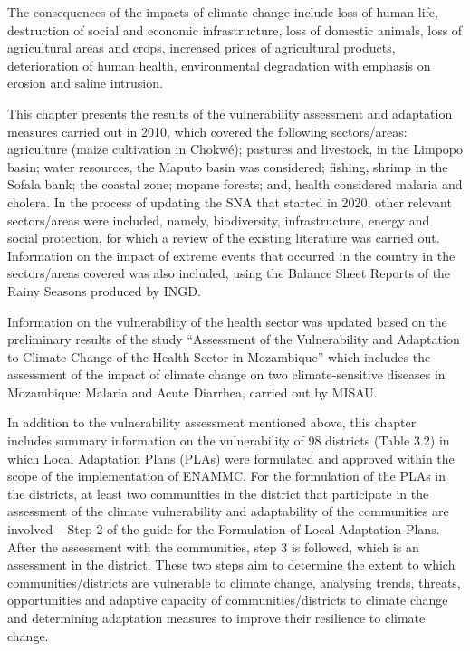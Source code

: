\documentclass[
]{book}
\begin{document}
The consequences of the impacts of climate change include loss of human life, destruction of social and economic infrastructure, loss of domestic animals, loss of agricultural areas and crops, increased prices of agricultural products, deterioration of human health, environmental degradation with emphasis on erosion and saline intrusion.

This chapter presents the results of the vulnerability assessment and adaptation measures carried out in 2010, which covered the following sectors/areas: agriculture (maize cultivation in Chokwé); pastures and livestock, in the Limpopo basin; water resources, the Maputo basin was considered; fishing, shrimp in the Sofala bank; the coastal zone; mopane forests; and, health considered malaria and cholera. In the process of updating the SNA that started in 2020, other relevant sectors/areas were included, namely, biodiversity, infrastructure, energy and social protection, for which a review of the existing literature was carried out. Information on the impact of extreme events that occurred in the country in the sectors/areas covered was also included, using the Balance Sheet Reports of the Rainy Seasons produced by INGD.

Information on the vulnerability of the health sector was updated based on the preliminary results of the study ``Assessment of the Vulnerability and Adaptation to Climate Change of the Health Sector in Mozambique'' which includes the assessment of the impact of climate change on two climate-sensitive diseases in Mozambique: Malaria and Acute Diarrhea, carried out by MISAU.

In addition to the vulnerability assessment mentioned above, this chapter includes summary information on the vulnerability of 98 districts (Table 3.2) in which Local Adaptation Plans (PLAs) were formulated and approved within the scope of the implementation of ENAMMC. For the formulation of the PLAs in the districts, at least two communities in the district that participate in the assessment of the climate vulnerability and adaptability of the communities are involved -- Step 2 of the guide for the Formulation of Local Adaptation Plans. After the assessment with the communities, step 3 is followed, which is an assessment in the district. These two steps aim to determine the extent to which communities/districts are vulnerable to climate change, analysing trends, threats, opportunities and adaptive capacity of communities/districts to climate change and determining adaptation measures to improve their resilience to climate change.
\end{document}
